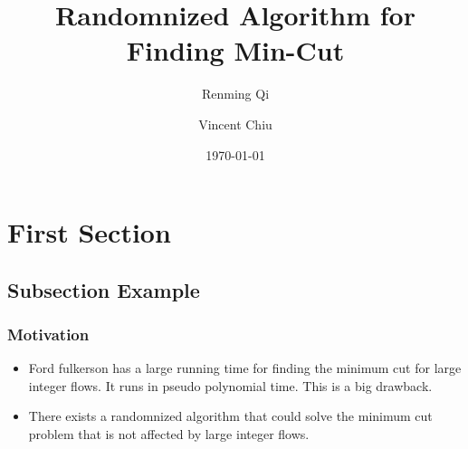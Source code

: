 \documentclass{beamer}
\title[Randomnized Algorithm]{Randomnized Algorithm for Finding Min-Cut } %
\author{Renming Qi \and Vincent Chiu} %
\date{\today} %
\begin{document}
\begin{frame}
\titlepage %
\end{frame}



\section{First Section} %

\subsection{Subsection Example} %




\begin{frame}
\frametitle{Motivation}
\begin{itemize}
	\item Ford fulkerson has a large running time for finding the minimum cut for large integer flows. It runs in pseudo polynomial time.  This is a big drawback.
	\item There exists a randomnized algorithm that could solve the minimum cut problem that is not affected by large integer flows.
\end{itemize}


\end{frame}
\end{document}
